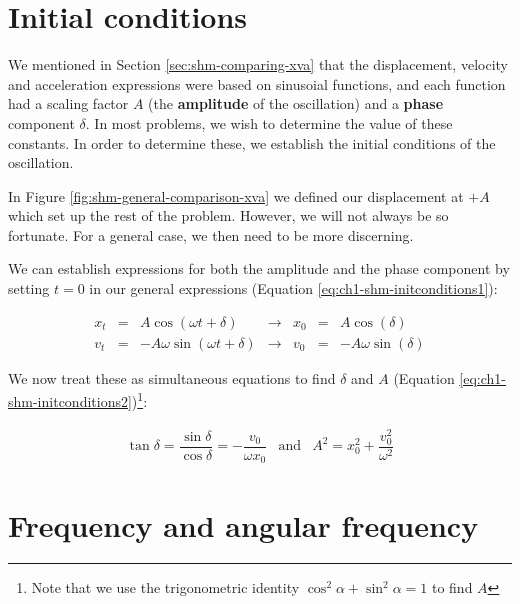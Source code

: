\documentclass[
]{book}
\begin{document}
\hypertarget{sec:shm-initialconditions}{%
\section{Initial conditions}\label{sec:shm-initialconditions}}

We mentioned in Section \ref{sec:shm-comparing-xva} that the displacement, velocity and acceleration expressions were based on sinusoial functions, and each function had a scaling factor \(A\) (the \textbf{amplitude} of the oscillation) and a \textbf{phase} component \(\delta\). In most problems, we wish to determine the value of these constants. In order to determine these, we establish the initial conditions of the oscillation.

In Figure \ref{fig:shm-general-comparison-xva} we defined our displacement at \(+A\) which set up the rest of the problem. However, we will not always be so fortunate. For a general case, we then need to be more discerning.

We can establish expressions for both the amplitude and the phase component by setting \(t = 0\) in our general expressions (Equation \eqref{eq:ch1-shm-initconditions1}):

\begin{equation}
\begin{array}{rclcrcl}
x_t &=& A  \cos (\omega t + \delta)       & \rightarrow & x_0 &=& A  \cos (\delta)\\
v_t &=& -A \omega \sin (\omega t + \delta)& \rightarrow & v_0 &=& -A \omega \sin ( \delta)
\end{array}
\label{eq:ch1-shm-initconditions1}
\end{equation}

We now treat these as simultaneous equations to find \(\delta\) and \(A\) (Equation \eqref{eq:ch1-shm-initconditions2})\footnote{Note that we use the trigonometric identity \(\cos^2 \alpha + \sin^2 \alpha = 1\) to find \(A\)}:

\begin{equation}
\begin{array}{rcl}
\tan \delta = \dfrac{\sin \delta}{\cos \delta} = -\dfrac{v_0}{\omega x_0} & \textrm{and} & A^2 = x_0^2 + \dfrac{v_0^2}{\omega^2}
\end{array}
\label{eq:ch1-shm-initconditions2}
\end{equation}

\hypertarget{sec:shm-freq-angularfreq}{%
\section{Frequency and angular frequency}\label{sec:shm-freq-angularfreq}}
\end{document}
